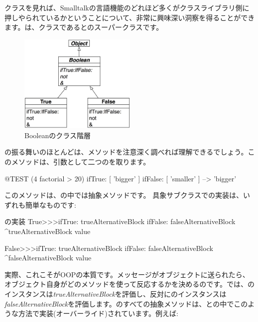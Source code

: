 \documentclass[a4paper,10pt,twoside]{book}
\begin{document}
クラスを見れば、Smalltalkの言語機能のどれほど多くがクラスライブラリ側に押しやられているかということについて、非常に興味深い洞察を得ることができます。は、クラスであるとのスーパークラスです。

\begin{figure}[ht]
  {\centerline {\includegraphics[width=0.5\textwidth]{BooleanHierarchy}}}
\caption{Booleanのクラス階層 }
\end{figure}

の振る舞いのほとんどは、メソッドを注意深く調べれば理解できるでしょう。このメソッドは、引数として二つのを取ります。

\begin{code}{@TEST}
(4 factorial > 20) ifTrue: [ 'bigger' ] ifFalse: [ 'smaller' ] --> 'bigger'
\end{code}

このメソッドは、の中では抽象メソッドです。
具象サブクラスでの実装は、いずれも簡単なものです:

\begin{method}{の実装}
True>>>ifTrue: trueAlternativeBlock ifFalse: falseAlternativeBlock 
    ^trueAlternativeBlock value

False>>>ifTrue: trueAlternativeBlock ifFalse: falseAlternativeBlock 
    ^falseAlternativeBlock value
\end{method}

実際、これこそがOOPの本質です。メッセージがオブジェクトに送られたら、オブジェクト自身がどのメソッドを使って反応するかを決めるのです。では、のインスタンスは\emph{trueAlternativeBlock}を評価し、反対にのインスタンスは\emph{falseAlternativeBlock}を評価します。のすべての抽象メソッドは、との中でこのような方法で実装(オーバーライド)されています。例えば:
\end{document}
